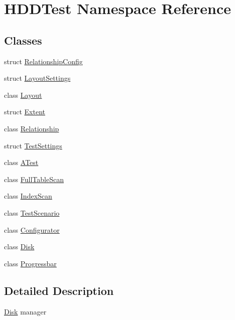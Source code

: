 \hypertarget{namespace_h_d_d_test}{\section{H\-D\-D\-Test Namespace Reference}
\label{namespace_h_d_d_test}
}
\subsection*{Classes}
\begin{DoxyCompactItemize}
\item 
struct \hyperlink{struct_h_d_d_test_1_1_relationship_config}{Relationship\-Config}
\item 
struct \hyperlink{struct_h_d_d_test_1_1_layout_settings}{Layout\-Settings}
\item 
class \hyperlink{class_h_d_d_test_1_1_layout}{Layout}
\item 
struct \hyperlink{struct_h_d_d_test_1_1_extent}{Extent}
\item 
class \hyperlink{class_h_d_d_test_1_1_relationship}{Relationship}
\item 
struct \hyperlink{struct_h_d_d_test_1_1_test_settings}{Test\-Settings}
\item 
class \hyperlink{class_h_d_d_test_1_1_a_test}{A\-Test}
\item 
class \hyperlink{class_h_d_d_test_1_1_full_table_scan}{Full\-Table\-Scan}
\item 
class \hyperlink{class_h_d_d_test_1_1_index_scan}{Index\-Scan}
\item 
class \hyperlink{class_h_d_d_test_1_1_test_scenario}{Test\-Scenario}
\item 
class \hyperlink{class_h_d_d_test_1_1_configurator}{Configurator}
\item 
class \hyperlink{class_h_d_d_test_1_1_disk}{Disk}
\item 
class \hyperlink{class_h_d_d_test_1_1_progressbar}{Progressbar}
\end{DoxyCompactItemize}


\subsection{Detailed Description}
\hyperlink{class_h_d_d_test_1_1_disk}{Disk} manager 